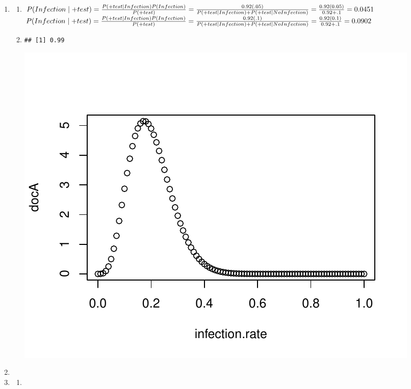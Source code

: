 \documentclass[12pt]{article}\usepackage[]{graphicx}\usepackage[]{color}
\makeatletter
\newenvironment{kframe}{%
 \def\at@end@of@kframe{}%
 \ifinner\ifhmode%
  \def\at@end@of@kframe{\end{minipage}}%
  \begin{minipage}{\columnwidth}%
 \fi\fi%
 \def\FrameCommand##1{\hskip\@totalleftmargin \hskip-\fboxsep
 \colorbox{shadecolor}{##1}\hskip-\fboxsep
     \hskip-\linewidth \hskip-\@totalleftmargin \hskip\columnwidth}%
 \MakeFramed {\advance\hsize-\width
   \@totalleftmargin\z@ \linewidth\hsize
   \@setminipage}}%
 {\par\unskip\endMakeFramed%
 \at@end@of@kframe}
\newenvironment{knitrout}{}{} %
\makeatother
\begin{document}
\begin{enumerate}
\begin{knitrout}
{}



\end{knitrout}

\item 
\begin{enumerate}
\item$P(Infection \mid + test) = \frac{P(+ test \mid Infection)P(Infection)}{P(+ test)} = \frac{0.92(.05)}{P(+ test \mid Infection) + P(+ test \mid No Infection)} \\
=  \frac{0.92(0.05)}{0.92+.1}= 0.0451$\\
$P(Infection \mid + test) = \frac{P(+ test \mid Infection)P(Infection)}{P(+ test)} = \frac{0.92(.1)}{P(+ test \mid Infection) + P(+ test \mid No Infection)} \\
=  \frac{0.92(0.1)}{0.92+.1}= 0.0902$

\item
\begin{knitrout}\footnotesize
{}\color{fgcolor}\begin{kframe}
\begin{verbatim}
## [1] 0.99
\end{verbatim}
\end{kframe}
\includegraphics[width=\linewidth]{figure/8b-1} 

\end{knitrout}
\end{enumerate}
\item
\item
\begin{enumerate}
\item 




\end{enumerate}
\end{enumerate}
\end{document}
